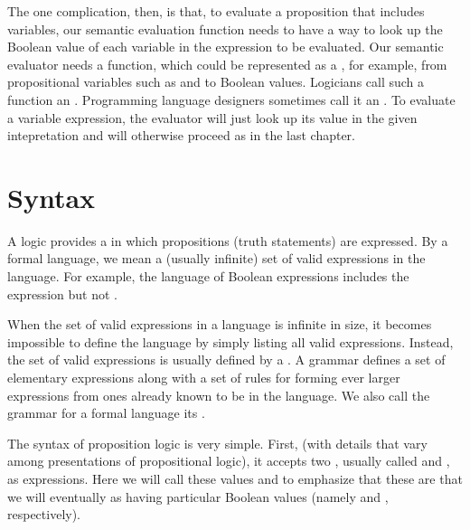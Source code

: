 \documentclass[letterpaper,10pt,english]{sphinxmanual}
\begin{document}
The one complication, then, is that, to evaluate a proposition that
includes variables, our semantic evaluation function needs to have a
way to look up the Boolean value of each variable in the expression to
be evaluated. Our semantic evaluator needs a function, which could be
represented as a , for example, from propositional variables such
as  and  to Boolean values.  Logicians call such a function an
. Programming language designers sometimes call it an
. To evaluate a variable expression, the evaluator will
just look up its value in the given intepretation and will otherwise
proceed as in the last chapter.


\section{Syntax}
\label{\detokenize{11-propositional-logic:syntax}}
A logic provides a  in which propositions (truth
statements) are expressed. By a formal language, we mean a (usually
infinite) set of valid expressions in the language. For example, the
language of Boolean expressions includes the expression  but not .

When the set of valid expressions in a language is infinite in size,
it becomes impossible to define the language by simply listing all
valid expressions. Instead, the set of valid expressions is usually
defined  by a . A grammar defines a set of
elementary expressions along with a set of rules for forming ever
larger expressions from ones already known to be in the language. We
also call the grammar for a formal language its .

The syntax of proposition logic is very simple. First, (with details
that vary among presentations of propositional logic), it accepts two
, usually called  and , as expressions.
Here we will call these values  and  to emphasize that
these are  that we will eventually  as having
particular Boolean values (namely  and , respectively).
\end{document}
